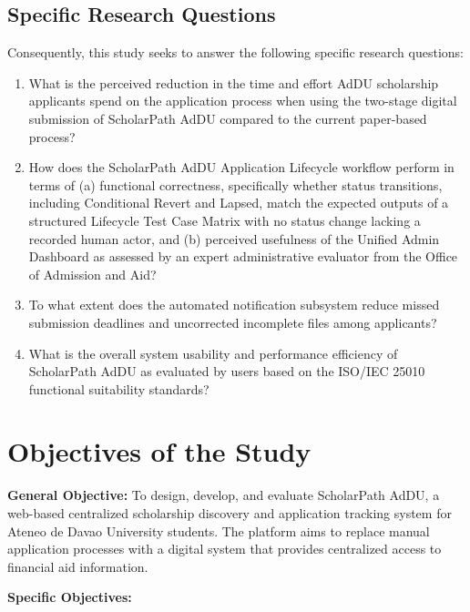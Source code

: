 \subsection*{Specific Research Questions}

Consequently, this study seeks to answer the following specific research questions:

\begin{enumerate}
  \item What is the perceived reduction in the time and effort AdDU scholarship applicants spend on the application process when using the two-stage digital submission of ScholarPath AdDU compared to the current paper-based process?
  \item How does the ScholarPath AdDU Application Lifecycle workflow perform
in terms of (a) functional correctness, specifically whether status
transitions, including Conditional Revert and Lapsed, match the expected
outputs of a structured Lifecycle Test Case Matrix with no status change
lacking a recorded human actor, and (b) perceived usefulness of the
Unified Admin Dashboard as assessed by an expert administrative evaluator
from the Office of Admission and Aid?
  \item To what extent does the automated notification subsystem reduce missed submission deadlines and uncorrected incomplete files among applicants?
  \item What is the overall system usability and performance efficiency of ScholarPath AdDU as evaluated by users based on the ISO/IEC 25010 functional suitability standards?
\end{enumerate}

\section{Objectives of the Study}

\textbf{General Objective:} To design, develop, and evaluate ScholarPath AdDU, a web-based centralized scholarship discovery and application tracking system for Ateneo de Davao University students. The platform aims to replace manual application processes with a digital system that provides centralized access to financial aid information.

\textbf{Specific Objectives:}

